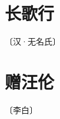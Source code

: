 \documentclass[12pt,UTF-8,openany]{ctexbook}
\begin{document}
\vspace{8pt}


\section{长歌行}

\begin{center}
    \vspace{10pt}
    
    \begin{normalsize}
        
        〔汉·无名氏〕
        
    \end{normalsize}
    
    \vspace{8pt}
    
    \begin{large}
        
        
        
        
        
        
    \end{large}
    
\end{center}

\vspace{8pt}


\section{赠汪伦}

\begin{center}
    \vspace{10pt}
    
    \begin{normalsize}
        
        〔李白〕
        
    \end{normalsize}
    
    \vspace{8pt}
    
    \begin{large}
        
        
        
    \end{large}
    
\end{center}
\end{document}
